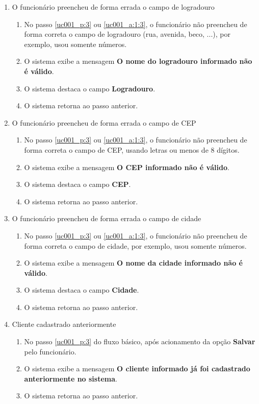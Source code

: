 \begin{enumerate}[label=E\arabic*]
	\item O funcionário preencheu de forma errada o campo de logradouro \label{uc001_e:4}
	\begin{enumerate}[label*=.\arabic*]		
		\item[] No passo \ref{uc001_p:3} ou \ref{uc001_a:1:3}, o funcionário não preencheu de forma correta o campo de logradouro (rua, avenida, beco, ...), por exemplo, usou somente números.		
		\item O sistema exibe a mensagem \textbf{O nome do logradouro informado não é válido}.
		\item O sistema destaca o campo \textbf{Logradouro}.
		\item O sistema retorna ao passo anterior.
	\end{enumerate}

	\item O funcionário preencheu de forma errada o campo de CEP \label{uc001_e:5}
	\begin{enumerate}[label*=.\arabic*]		
		\item[] No passo \ref{uc001_p:3} ou \ref{uc001_a:1:3}, o funcionário não preencheu de forma correta o campo de CEP, usando letras ou menos de 8 dígitos.		
		\item O sistema exibe a mensagem \textbf{O CEP informado não é válido}.
		\item O sistema destaca o campo \textbf{CEP}.
		\item O sistema retorna ao passo anterior.
	\end{enumerate}

	\item O funcionário preencheu de forma errada o campo de cidade \label{uc001_e:6}
	\begin{enumerate}[label*=.\arabic*]		
		\item[] No passo \ref{uc001_p:3} ou \ref{uc001_a:1:3}, o funcionário não preencheu de forma correta o campo de cidade, por exemplo, usou somente números.		
		\item O sistema exibe a mensagem \textbf{O nome da cidade informado não é válido}.
		\item O sistema destaca o campo \textbf{Cidade}.
		\item O sistema retorna ao passo anterior.
	\end{enumerate}

	\item Cliente cadastrado anteriormente \label{uc001_e:7}
	\begin{enumerate}[label*=.\arabic*]
		\item[] No passo \ref{uc001_p:3} do fluxo básico, após acionamento da opção \textbf{Salvar} pelo funcionário.
		\item O sistema exibe a mensagem \textbf{O cliente informado já foi cadastrado anteriormente no sistema}.
		\item O sistema retorna ao passo anterior.
	\end{enumerate}
\end{enumerate}

